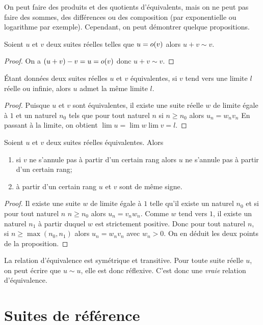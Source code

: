 On peut faire des produits et des quotients d'équivalents, mais on ne peut pas faire des sommes, des différences ou des composition (par exponentielle ou logarithme par exemple). Cependant, on peut démontrer quelque propositions.
\begin{prop}
  Soient \(u\) et \(v\) deux suites réelles telles que \(u = o\mathopen{}\left(v\right)\) alors \(u+v \sim v\).
\end{prop}
\begin{proof}
  On a \((u+v)-v=u = o\mathopen{}\left(v\right)\) donc \(u+v \sim v\).
\end{proof}
\begin{prop}
  Étant données deux suites réelles \(u\) et \(v\) équivalentes, si \(v\) tend vers une limite \(l\) réelle ou infinie, alors \(u\) admet la même limite \(l\).
\end{prop}
\begin{proof}
  Puisque \(u\) et \(v\) sont équivalentes, il existe une suite réelle \(w\) de limite égale à \(1\) et un naturel \(n_0\) tels que pour tout naturel \(n\) si \(n \geqslant n_0\) alors \(u_n = w_n v_n\) En passant à la limite, on obtient \(\lim u = \lim w \lim v =l\).
\end{proof}
\begin{prop}
  Soient \(u\) et \(v\) deux suites réelles équivalentes. Alors
  \begin{enumerate}
  \item si \(v\) ne s'annule pas à partir d'un certain rang alors \(u\) ne s'annule pas à partir d'un certain rang;
  \item à partir d'un certain rang \(u\) et \(v\) sont de même signe.
  \end{enumerate}
\end{prop}
\begin{proof}
  Il existe une suite \(w\) de limite égale à \(1\) telle qu'il existe un naturel \(n_0\) et si pour tout naturel \(n\) \(n \geqslant n_0\) alors \(u_n = v_n w_n\). Comme \(w\) tend vers \(1\), il existe un naturel \(n_1\) à partir duquel \(w\) est strictement positive. Donc pour tout naturel \(n\), si \(n \geqslant \max(n_0,n_1)\) alors \(u_n = w_n v_n\) avec \(w_n >0\). On en déduit les deux points de la proposition.
\end{proof}

La relation d'équivalence est symétrique et transitive. Pour toute suite réelle \(u\), on peut écrire que \(u \sim u\), elle est donc réflexive. C'est donc une \emph{vraie} relation d'équivalence.

\section{Suites de référence}

